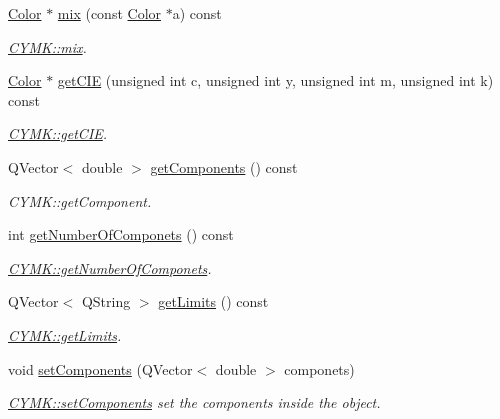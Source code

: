 \begin{DoxyCompactItemize}
\hyperlink{class_color}{Color} $\ast$ \hyperlink{class_c_y_m_k_adeb4691eafbb53e15538a3d829f59a14}{mix} (const \hyperlink{class_color}{Color} $\ast$a) const
\begin{DoxyCompactList}\small\item\em \hyperlink{class_c_y_m_k_adeb4691eafbb53e15538a3d829f59a14}{C\+Y\+M\+K\+::mix}. \end{DoxyCompactList}\item 
\hyperlink{class_color}{Color} $\ast$ \hyperlink{class_c_y_m_k_ad92097bbc8fa491be286a76588285d1e}{get\+C\+IE} (unsigned int c, unsigned int y, unsigned int m, unsigned int k) const
\begin{DoxyCompactList}\small\item\em \hyperlink{class_c_y_m_k_ad92097bbc8fa491be286a76588285d1e}{C\+Y\+M\+K\+::get\+C\+IE}. \end{DoxyCompactList}\item 
Q\+Vector$<$ double $>$ \hyperlink{class_c_y_m_k_a46e1058b0332d73710efa5d9f4644ba2}{get\+Components} () const
\begin{DoxyCompactList}\small\item\em C\+Y\+M\+K\+::get\+Component. \end{DoxyCompactList}\item 
int \hyperlink{class_c_y_m_k_ab3f005a1cc28f715192ad4fc90ded6b8}{get\+Number\+Of\+Componets} () const
\begin{DoxyCompactList}\small\item\em \hyperlink{class_c_y_m_k_ab3f005a1cc28f715192ad4fc90ded6b8}{C\+Y\+M\+K\+::get\+Number\+Of\+Componets}. \end{DoxyCompactList}\item 
Q\+Vector$<$ Q\+String $>$ \hyperlink{class_c_y_m_k_a9e0f2df82394cab1f95782f381c560ab}{get\+Limits} () const
\begin{DoxyCompactList}\small\item\em \hyperlink{class_c_y_m_k_a9e0f2df82394cab1f95782f381c560ab}{C\+Y\+M\+K\+::get\+Limits}. \end{DoxyCompactList}\item 
void \hyperlink{class_c_y_m_k_a897a2a1030cfd10dc16d5e2de825b45e}{set\+Components} (Q\+Vector$<$ double $>$ componets)
\begin{DoxyCompactList}\small\item\em \hyperlink{class_c_y_m_k_a897a2a1030cfd10dc16d5e2de825b45e}{C\+Y\+M\+K\+::set\+Components} set the components inside the object. \end{DoxyCompactList}\end{DoxyCompactItemize}
